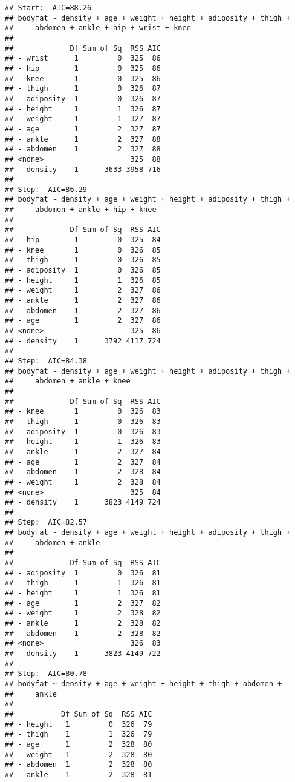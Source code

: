 \documentclass[
]{article}
\begin{document}
\begin{verbatim}
## Start:  AIC=88.26
## bodyfat ~ density + age + weight + height + adiposity + thigh + 
##     abdomen + ankle + hip + wrist + knee
## 
##             Df Sum of Sq  RSS AIC
## - wrist      1         0  325  86
## - hip        1         0  325  86
## - knee       1         0  325  86
## - thigh      1         0  326  87
## - adiposity  1         0  326  87
## - height     1         1  326  87
## - weight     1         1  327  87
## - age        1         2  327  87
## - ankle      1         2  327  88
## - abdomen    1         2  327  88
## <none>                    325  88
## - density    1      3633 3958 716
## 
## Step:  AIC=86.29
## bodyfat ~ density + age + weight + height + adiposity + thigh + 
##     abdomen + ankle + hip + knee
## 
##             Df Sum of Sq  RSS AIC
## - hip        1         0  325  84
## - knee       1         0  326  85
## - thigh      1         0  326  85
## - adiposity  1         0  326  85
## - height     1         1  326  85
## - weight     1         2  327  86
## - ankle      1         2  327  86
## - abdomen    1         2  327  86
## - age        1         2  327  86
## <none>                    325  86
## - density    1      3792 4117 724
## 
## Step:  AIC=84.38
## bodyfat ~ density + age + weight + height + adiposity + thigh + 
##     abdomen + ankle + knee
## 
##             Df Sum of Sq  RSS AIC
## - knee       1         0  326  83
## - thigh      1         0  326  83
## - adiposity  1         0  326  83
## - height     1         1  326  83
## - ankle      1         2  327  84
## - age        1         2  327  84
## - abdomen    1         2  328  84
## - weight     1         2  328  84
## <none>                    325  84
## - density    1      3823 4149 724
## 
## Step:  AIC=82.57
## bodyfat ~ density + age + weight + height + adiposity + thigh + 
##     abdomen + ankle
## 
##             Df Sum of Sq  RSS AIC
## - adiposity  1         0  326  81
## - thigh      1         1  326  81
## - height     1         1  326  81
## - age        1         2  327  82
## - weight     1         2  328  82
## - ankle      1         2  328  82
## - abdomen    1         2  328  82
## <none>                    326  83
## - density    1      3823 4149 722
## 
## Step:  AIC=80.78
## bodyfat ~ density + age + weight + height + thigh + abdomen + 
##     ankle
## 
##           Df Sum of Sq  RSS AIC
## - height   1         0  326  79
## - thigh    1         1  326  79
## - age      1         2  328  80
## - weight   1         2  328  80
## - abdomen  1         2  328  80
## - ankle    1         2  328  81

\end{verbatim}
\end{document}
